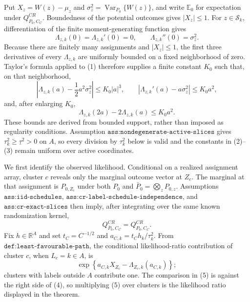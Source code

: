 Put \(X_z=W(z)-\mu_z\) and \(\sigma_z^2=\operatorname{Var}_{P_0}\{W(z)\}\), and write \(\mathbb E_0\) for expectation under \(Q^{CR}_{P_0,C_C}\).  Boundedness of the potential outcomes gives \(|X_z|\leq1\).  For \(z\in\mathcal S_k\), differentiation of the finite moment-generating function gives
\[
 \Lambda_{z,k}(0)=\Lambda_{z,k}'(0)=0,
 \qquad \Lambda_{z,k}''(0)=\sigma_z^2.                    \tag{1}
\]
Because there are finitely many assignments and \(|X_z|\leq1\), the first three derivatives of every \(\Lambda_{z,k}\) are uniformly bounded on a fixed neighborhood of zero.  Taylor's formula applied to (1) therefore supplies a finite constant \(K_0\) such that, on that neighborhood,
\[
 \left|\Lambda_{z,k}(a)-\frac12a^2\sigma_z^2\right|
 \leq K_0|a|^3,
 \qquad
 \left|\Lambda_{z,k}'(a)-a\sigma_z^2\right|
 \leq K_0a^2,                                                   \tag{2}
\]
and, after enlarging \(K_0\),
\[
 \Lambda_{z,k}(2a)-2\Lambda_{z,k}(a)\leq K_0a^2.          \tag{3}
\]
These bounds are derived from bounded support, rather than imposed as regularity conditions.  Assumption \(\texttt{ass:nondegenerate-active-slices}\) gives \(\tau_k^2\geq\underline\tau^2>0\) on \(A\), so every division by \(\tau_k^2\) below is valid and the constants in (2)--(3) remain uniform over active coordinates.

We first identify the observed likelihood.  Conditional on a realized assignment array, cluster \(c\) reveals only the marginal outcome vector at \(Z_c\).  The marginal at that assignment is \(P_{0,Z_c}\) under both \(P_0\) and \(\bar P_0=\bigotimes_zP_{0,z}\).  Assumptions \(\texttt{ass:iid-schedules}\), \(\texttt{ass:cr-label-schedule-independence}\), and \(\texttt{ass:cr-exact-slices}\) then imply, after integrating over the same known randomization kernel,
\[
 Q^{CR}_{\bar P_0,C_C}=Q^{CR}_{P_0,C_C}.                  \tag{4}
\]
Fix \(h\in\mathbb R^A\) and set \(t_C=C^{-1/2}\) and
\(a_{C,k}=t_Ch_k/\tau_k^2\).  From \(\texttt{def:least-favourable-path}\), the conditional likelihood-ratio contribution of cluster \(c\), when \(L_c=k\in A\), is
\[
 \exp\!\left\{a_{C,k}X_{Z_c}
              -\Lambda_{Z_c,k}(a_{C,k})\right\};               \tag{5}
\]
clusters with labels outside \(A\) contribute one.  The comparison in (5) is against the right side of (4), so multiplying (5) over clusters is the likelihood ratio displayed in the theorem.


